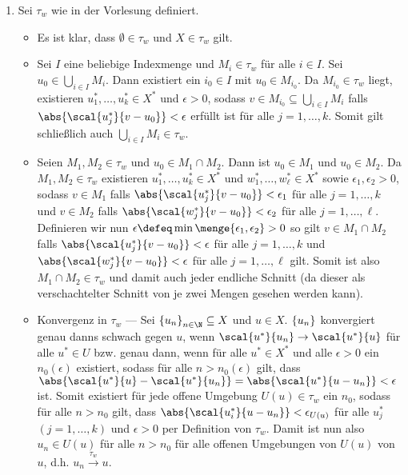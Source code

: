 \begin{exercisePage}
	\begin{enumerate}[label=(zu \alph*), leftmargin=*]
		\item Sei $\tau_w$ wie in der Vorlesung definiert.
		\begin{itemize}
			\item Es ist klar, dass $\emptyset \in \tau_w$ und $X \in \tau_w$ gilt.
			\item Sei $I$ eine beliebige Indexmenge und $M_i \in \tau_w$ für alle $i \in I$. Sei $u_0 \in \bigcup_{i \in I} M_i$. Dann existiert ein $i_0 \in I$ mit $u_0 \in M_{i_0}$. Da $M_{i_0} \in \tau_w$ liegt, existieren $u_1^\ast, \dots, u_k^\ast \in X^\ast$ und $\epsilon > 0$, sodass $v \in M_{i_0} \subseteq \bigcup_{i \in I} M_i$ falls $\abs{\scal{u_j^\ast}{v-u_0}} < \epsilon$ erfüllt ist für alle $j = 1, \dots, k$. Somit gilt schließlich auch $\bigcup_{i \in I} M_i \in \tau_w$.
			\item Seien $M_1, M_2 \in \tau_w$ und $u_0 \in M_1 \cap M_2$. Dann ist $u_0 \in M_1$ und $u_0 \in M_2$. Da $M_1, M_2 \in \tau_w$ existieren $u^\ast_1, \dots, u^\ast_k \in X^\ast$ und $w^\ast_1, \dots, w_\ell^\ast \in X^\ast$ sowie $\epsilon_1, \epsilon_2 > 0$, sodass $v \in M_1$ falls $\abs{\scal{u^\ast_j}{v-u_0}} < \epsilon_1$ für alle $j = 1, \dots, k$ und $v \in M_2$ falls $\abs{\scal{w^\ast_j}{v-u_0}} < \epsilon_2$ für alle $j = 1, \dots, \ell$. Definieren wir nun $\epsilon \defeq \min\menge{\epsilon_1, \epsilon_2} > 0$ so gilt $v \in M_1 \cap M_2$ falls $\abs{\scal{u^\ast_j}{v-u_0}} < \epsilon$ für alle $j = 1, \dots, k$ und $\abs{\scal{w^\ast_j}{v-u_0}} < \epsilon$ für alle $j = 1, \dots, \ell$ gilt. Somit ist also $M_1 \cap M_2 \in \tau_w$ und damit auch jeder endliche Schnitt (da dieser als verschachtelter Schnitt von je zwei Mengen gesehen werden kann).
			\item Konvergenz in $\tau_w$ --- Sei $\folge{u_n}{n \in \N} \subseteq X$ und $u \in X$. $\left\{ u_n \right\}_{}$ konvergiert genau danns schwach gegen $u$, wenn $\scal{u^\ast}{u_n} \to \scal{u^\ast}{u}$ für alle $u^\ast \in U$ bzw. genau dann, wenn für alle $u^\ast \in X^\ast$ und alle $\epsilon > 0$ ein $n_0(\epsilon)$ existiert, sodass für alle $n > n_0(\epsilon)$ gilt, dass $\abs{\scal{u^\ast}{u} - \scal{u^\ast}{u_n}} = \abs{\scal{u^\ast}{u-u_n}} < \epsilon$ ist. Somit existiert für jede offene Umgebung $U(u) \in \tau_w$ ein $n_0$, sodass für alle $n > n_0$ gilt, dass $\abs{\scal{u_i^\ast}{u-u_n}} <\epsilon_{U(u)}$ für alle $u^\ast_j$ $(j=1, \dots, k)$ und $\epsilon > 0$ per Definition von $\tau_w$.
			Damit ist nun also $u_n \in U(u)$ für alle $n > n_0$ für alle offenen Umgebungen von $U(u)$ von $u$, d.h. $u_n \overset{\tau_w}{\to} u$.
			

\end{itemize}
\end{enumerate}
\end{exercisePage}
